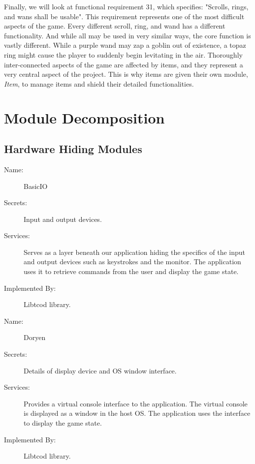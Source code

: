 \documentclass[12pt, titlepage]{article}
\newcommand{\newSection}[1]{
  \newpage
  \section{#1}
}
\begin{document}
    Finally, we will look at functional requirement 31, which specifies: "Scrolls, rings, and wans shall be usable". This requirement represents one of the most difficult aspects of the game. Every different scroll, ring, and wand has a different functionality. And while all may be used in very similar ways, the core function is vastly different. While a purple wand may zap a goblin out of existence, a topaz ring might cause the player to suddenly begin levitating in the air. Thoroughly inter-connected aspects of the game are affected by items, and they represent a very central aspect of the project. This is why items are given their own module, \textit{Item}, to manage items and shield their detailed functionalities.\\



\newSection{Module Decomposition} \label{SecMD}

    \subsection{Hardware Hiding Modules}

        \bigskip\begin{description}
            \item[Name:]BasicIO
            \item[Secrets:]Input and output devices.
            \item[Services:]Serves as a layer beneath our application hiding the specifics of the input and output devices such as keystrokes and the monitor. The application uses it to retrieve commands from the user and display the game state.
            \item[Implemented By:]Libtcod library.
        \end{description}

        \bigskip\begin{description}
            \item[Name:]Doryen
            \item[Secrets:]Details of display device and OS window interface.
            \item[Services:]Provides a virtual console interface to the application. The virtual console is displayed as a window in the host OS. The application uses the interface to display the game state.
            \item[Implemented By:]Libtcod library.
        \end{description}
\end{document}
